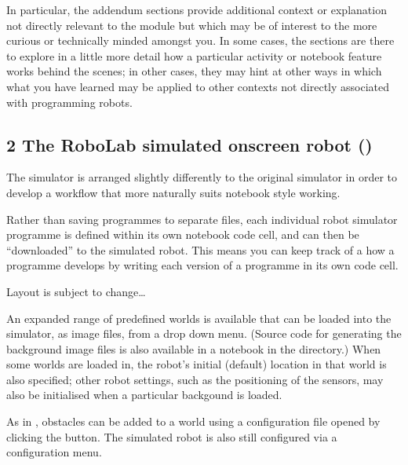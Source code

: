 \documentclass[letterpaper,10pt,english]{sphinxmanual}
\let\sphinxpxdimen\pdfpxdimen\else\newdimen\sphinxpxdimen
\begin{document}
In particular, the addendum sections provide additional context or explanation not directly relevant to the module but which may be of interest to the more curious or technically minded amongst you. In some cases, the sections are there to explore in a little more detail how a particular activity or notebook feature works behind the scenes; in other cases, they may hint at other ways in which what you have learned may be applied to other contexts not directly associated with programming robots.


\subsection{2 The RoboLab simulated on\sphinxhyphen{}screen robot ()}
\label{\detokenize{content/00_SOFTWARE_GUIDE/Section_00_02-nb3devsim:2-The-RoboLab-simulated-on-screen-robot-(nbev3devsim)}}\label{\detokenize{content/00_SOFTWARE_GUIDE/Section_00_02-nb3devsim::doc}}
The  simulator is arranged slightly differently to the original  simulator in order to develop a workflow that more naturally suits notebook style working.

Rather than saving programmes to separate files, each individual robot simulator programme is defined within its own notebook code cell, and can then be “downloaded” to the simulated robot. This means you can keep track of a how a programme develops by writing each version of a programme in its own code cell.



Layout is subject to change…



\sphinxincludegraphics[width=2518\sphinxpxdimen,height=1592\sphinxpxdimen]{{nbev3devsim_overview}.png}

An expanded range of predefined worlds is available that can be loaded into the simulator, as image files, from a drop down menu. (Source code for generating the background image files is also available in a notebook in the  directory.) When some worlds are loaded in, the robot’s initial (default) location in that world is also specified; other robot settings, such as the positioning of the sensors, may also be initialised when a particular backgound is loaded.

As in , obstacles can be added to a world using a configuration file opened by clicking the  button. The simulated robot is also still configured via a configuration menu.
\end{document}

